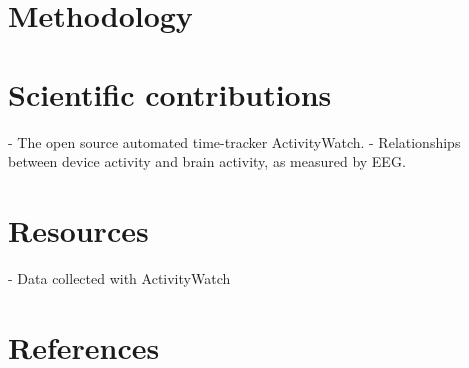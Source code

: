 \documentclass[a4paper]{article}   %
\begin{document}
\section{Methodology}

\section{Scientific contributions}
\begin{markdown}

 - The open source automated time-tracker ActivityWatch.
 - Relationships between device activity and brain activity, as measured by EEG.

\end{markdown}

\section{Resources}
\begin{markdown}

 - Data collected with ActivityWatch

\end{markdown}


\section{References}

\nocite{*}
\printbibliography{}
\end{document}
